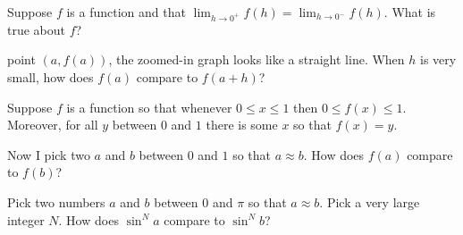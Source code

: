 \documentclass{ximera}
\newcommand{\recommendation}[1]{}
\begin{document}
\begin{shuffle}
\begin{problem}

  Suppose $f$ is a function and that $\lim_{h \to 0^{+}} f(h) = \lim_{h \to 0^{-}} f(h)$.  What is true about $f$?
  \begin{multipleChoice}
  \end{multipleChoice}
\end{problem}

\begin{problem}
  point $(a,f(a))$, the zoomed-in graph looks like a straight line.
  When $h$ is very small, how does $f(a)$ compare to $f(a+h)$?
  \begin{multipleChoice}
  \end{multipleChoice}
\end{problem}

\begin{problem}
  Suppose $f$ is a function so that whenever $0 \leq x \leq 1$ then
  $0 \leq f(x) \leq 1$.  Moreover, for all $y$ between $0$ and $1$
  there is some $x$ so that $f(x) = y$.

  Now I pick two $a$ and $b$ between $0$ and $1$ so that $a \approx b$.  How does $f(a)$ compare to $f(b)$?
  \begin{multipleChoice}
  \end{multipleChoice}
\end{problem}

\begin{problem}
  Pick two numbers $a$ and $b$ between $0$ and $\pi$ so that
  $a \approx b$.  Pick a very large integer $N$.  How does $\sin^N a$
  compare to $\sin^N b$?
  \begin{multipleChoice}
  \end{multipleChoice}
\end{problem}


\end{shuffle}
\end{document}

